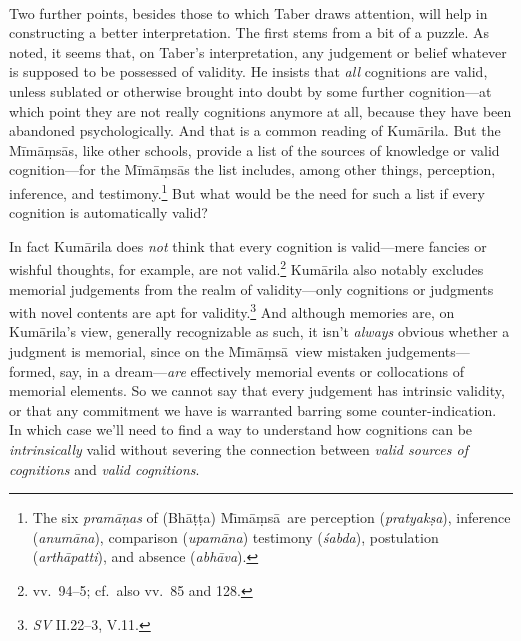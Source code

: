 \documentclass[11pt,letterpaper,oneside]{amsart}
\newcommand{\e}{\emph}
\newcommand{\mim}{M\={\i}m\={a}\d{m}s\={a}}
\begin{document}


\

Two further points, besides those to which Taber draws attention, will help in constructing a better interpretation. The first stems from a bit of a puzzle. As noted, it seems that, on Taber's interpretation, any judgement or belief whatever is supposed to be possessed of validity. He insists that \emph{all} cognitions are valid, unless sublated or otherwise brought into doubt by some further cognition---at which point they are not really cognitions anymore at all, because they have been abandoned psychologically. And that is a common reading of Kum\=arila. But the M\=im\=a\d ms\=as, like other schools, provide a list of the sources of knowledge or valid cognition---for the M\=im\=a\d ms\=as the list includes, among other things, perception, inference, and testimony.\footnote{The six \e{pram\={a}\d{n}as} of (Bh\={a}\d{t}\d{t}a) \mim\ are perception (\e{pratyak\d{s}a}), inference (\e{anum\={a}na}), comparison (\e{upam\={a}na}) testimony (\e{\'{s}abda}), postulation (\e{arth\={a}patti}), and absence (\e{abh\=ava}).\label{thesix}} But what would be the need for such a list if every cognition is automatically valid?


In fact Kum\=arila does \emph{not} think that every cognition is valid---mere fancies or wishful thoughts, for example, are not valid.\footnote{vv.\ 94--5; cf.\ also vv.\ 85 and 128.} Kum\=arila also notably excludes memorial judgements from the realm of validity---only cognitions or judgments with novel contents are apt for validity.\footnote{\emph{SV} II.22--3, V.11.} And although memories are, on Kum\=arila's view, generally recognizable as such, it isn't \e{always} obvious whether a judgment is memorial, since on the \mim\ view mistaken judgements---formed, say, in a dream---\e{are} effectively memorial events or collocations of memorial elements. So we cannot say that every judgement has intrinsic validity, or that any commitment we have is warranted barring some counter-indication. In which case we'll need to find a way to understand how cognitions can be \emph{intrinsically} valid without severing the connection between \emph{valid sources of cognitions} and \emph{valid cognitions}.
\end{document}
